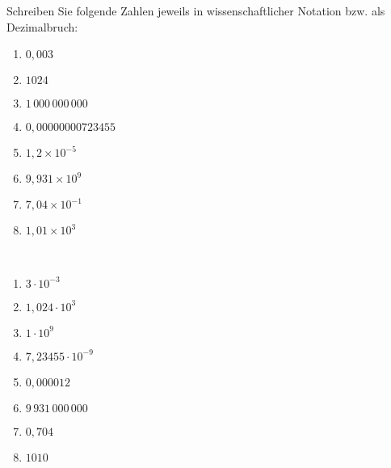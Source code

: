 \documentclass[12pt]{exam}
\begin{document}
\begin{questions}
Schreiben Sie folgende Zahlen jeweils in wissenschaftlicher Notation bzw. als Dezimalbruch:\\
\parbox{0.5\textwidth}{\begin{enumerate}
		\item $0,003$
		\item $1024$
		\item $1\,000\,000\,000$
		\item $0,00000000723455$
\end{enumerate}}\parbox{0.5\textwidth}{\begin{enumerate}\setcounter{enumi}{4}
		\item $1,2\times 10^{-5}$
		\item $9,931\times 10^9$
		\item $7,04\times 10^{-1}$
		\item $1,01\times 10^{3}$
\end{enumerate}}
\begin{solution}\\
	\parbox{0.5\textwidth}{\begin{enumerate}
			\item $3\cdot10^{-3}$
			\item $1,024\cdot10^{3}$
			\item $1\cdot10^{9}$
			\item $7,23455\cdot10^{-9}$
	\end{enumerate}}\parbox{0.5\textwidth}{\begin{enumerate}\setcounter{enumi}{4}
			\item $0,000012$
			\item $9\,931\,000\,000$
			\item $0,704$
			\item $1010$
	\end{enumerate}}
\end{solution}





\end{questions}
\end{document}

